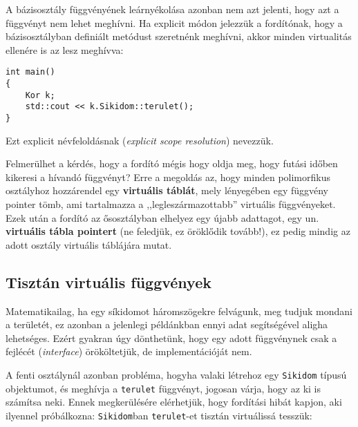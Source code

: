 \documentclass[a4paper,11.5pt,table]{article}
\begin{document}
	A bázisosztály függvényének leárnyékolása azonban nem azt jelenti, hogy azt a függvényt nem lehet meghívni. Ha explicit módon jelezzük a fordítónak, hogy a bázisosztályban definiált metódust szeretnénk meghívni, akkor minden virtualitás ellenére is az lesz meghívva:
	\begin{lstlisting}
int main()
{
	Kor k;
	std::cout << k.Sikidom::terulet();
}
	\end{lstlisting}
	Ezt explicit névfeloldásnak (\textit{explicit scope resolution}) nevezzük.
	
	\medskip
	Felmerülhet a kérdés, hogy a fordító mégis hogy oldja meg, hogy futási időben kikeresi a hívandó függvényt? Erre a megoldás az, hogy minden polimorfikus osztályhoz hozzárendel egy \textbf{virtuális táblát}, mely lényegében egy függvény pointer tömb, ami tartalmazza a ,,legleszármazottabb'' virtuális függvényeket. Ezek után a fordító az ősosztályban elhelyez egy újabb adattagot, egy un. \textbf{virtuális tábla pointert} (ne feledjük, ez öröklődik tovább!), ez pedig mindig az adott osztály virtuális táblájára mutat.
	\subsection{Tisztán virtuális függvények}
	Matematikailag, ha egy síkidomot háromszögekre felvágunk, meg tudjuk mondani a területét, ez azonban a jelenlegi példánkban ennyi adat segítségével aligha lehetséges. Ezért gyakran úgy dönthetünk, hogy egy adott függvénynek csak a fejlécét (\textit{interface}) örököltetjük, de implementációját nem.
	
	A fenti osztálynál azonban probléma, hogyha valaki létrehoz egy \texttt{Sikidom} típusú objektumot, és meghívja a \texttt{terulet} függvényt, jogosan várja, hogy az ki is számítsa neki. Ennek megkerülésére elérhetjük, hogy fordítási hibát kapjon, aki ilyennel próbálkozna: \texttt{Sikidom}ban \texttt{terulet}-et tisztán virtuálissá tesszük:
	
\end{document}
